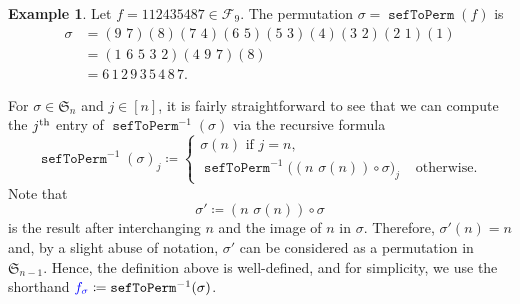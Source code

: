 \documentclass[reqno]{amsart}
\theoremstyle{definition}
\newtheorem{example}[theorem]{Example}
\newcommand{\defin}[1]{%
\relax\ifmmode%
\textcolor{blue}{#1}%
\else\textcolor{blue}{\emph{#1}}%
\fi%
}
\newcommand{\thsup}{\textnormal{th}}
\newcommand{\symS}{\mathfrak{S}}
\newcommand{\SEF}{\mathcal{F}}  %
\DeclareMathOperator{\sefToPerm}{\mathtt{sefToPerm}}
\begin{document}
\begin{example}\label{ex:sefToPerm}
Let $f = 112435487 \in \SEF_9$.
The permutation $\sigma=\sefToPerm(f)$ is
 \begin{align*}
 	\sigma &=(9\,\,7)(8)(7\,\,4)(6\,\,5)(5\,\,3)(4)(3\,\,2)(2\,\,1)(1)\\
 	&=(1\,\,6\,\,5\,\,3\,\,2)(4\,\,9\,\,7)(8)\\
 	&=6\,1\,2\,9\,3\,5\,4\,8\,7.
 \end{align*}
\end{example}




For $\sigma \in \symS_n$ and $j \in [n]$,
it is fairly straightforward to see that we can compute
the $j^\thsup$ entry of $\sefToPerm^{-1}(\sigma)$
via the recursive formula
\begin{equation}\label{eq:permToSefRecursion}
 \sefToPerm^{-1}(\sigma)_j \coloneqq 
\begin{cases}
 \sigma(n) \text{ if $j=n$,} \\
 \sefToPerm^{-1}\big( \left(n\,\,\sigma(n)\right)\circ\sigma \big)_j &\text{ otherwise}.
\end{cases}
\end{equation}
Note that 
\begin{equation}\label{eq:permProjection}
 \sigma' \coloneqq \left(n\,\,\sigma(n)\right)\circ\sigma
\end{equation}
is the result after interchanging $n$ and the image of $n$ in $\sigma$.
Therefore, $\sigma'(n)= n$ and, by a slight abuse of notation, $\sigma'$ can be considered as a permutation in $\symS_{n-1}$.
Hence, the definition above is well-defined, and for simplicity,
we use the shorthand $\defin{f_\sigma} \coloneqq \sefToPerm^{-1}(\sigma)$.
\end{document}
